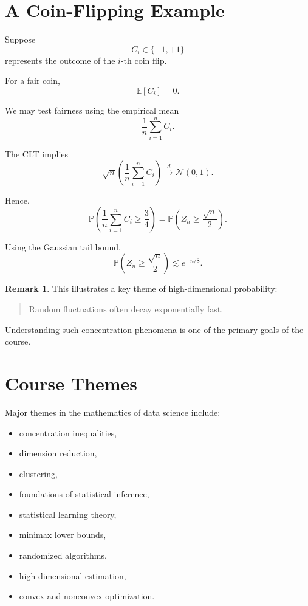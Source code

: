 \documentclass[12pt,oneside]{book}
\numberwithin{equation}{section}
\theoremstyle{definition}
\newtheorem{remark}{Remark}[section]
\theoremstyle{plain}
\theoremstyle{remark}
\newcommand{\E}{\mathbb{E}}
\newcommand{\Prob}{\mathbb{P}}
\newcommand{\convd}{\overset{d}{\to}}
\newcommand{\Normal}{\mathcal{N}}
\begin{document}
\section{A Coin-Flipping Example}

Suppose
\[
C_i\in\{-1,+1\}
\]
represents the outcome of the $i$-th coin flip.

For a fair coin,
\[
\E[C_i]=0.
\]

We may test fairness using the empirical mean
\[
\frac{1}{n}\sum_{i=1}^n C_i.
\]

The CLT implies
\[
\sqrt{n}
\left(
\frac{1}{n}\sum_{i=1}^n C_i
\right)
\convd
\Normal(0,1).
\]

Hence,
\[
\Prob\left(
\frac{1}{n}\sum_{i=1}^n C_i
\geq \frac{3}{4}
\right)
=
\Prob\left(
Z_n \geq \frac{\sqrt{n}}{2}
\right).
\]

Using the Gaussian tail bound,
\[
\Prob\left(
Z_n \geq \frac{\sqrt{n}}{2}
\right)
\lesssim
e^{-n/8}.
\]

\begin{remark}
This illustrates a key theme of high-dimensional probability:

\begin{quote}
Random fluctuations often decay exponentially fast.
\end{quote}

Understanding such concentration phenomena is one of the primary goals of the course.
\end{remark}

\section{Course Themes}

Major themes in the mathematics of data science include:
\begin{itemize}
\item concentration inequalities,
\item dimension reduction,
\item clustering,
\item foundations of statistical inference,
\item statistical learning theory,
\item minimax lower bounds,
\item randomized algorithms,
\item high-dimensional estimation,
\item convex and nonconvex optimization.
\end{itemize}
\end{document}
